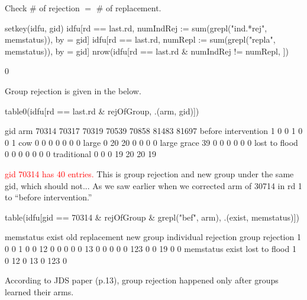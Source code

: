 Check \# of rejection $=$ \# of replacement.
\begin{Schunk}
\begin{Sinput}
setkey(idfu, gid)
idfu[rd == last.rd, numIndRej := sum(grepl("ind.*rej", memstatus)), by = gid]
idfu[rd == last.rd, numRepl := sum(grepl("repla", memstatus)), by = gid]
nrow(idfu[rd == last.rd & numIndRej != numRepl, ])
\end{Sinput}
\begin{Soutput}
[1] 0
\end{Soutput}
\end{Schunk}
Group rejection is given in the below.
\begin{Schunk}
\begin{Sinput}
table0(idfu[rd == last.rd & rejOfGroup, .(arm, gid)])
\end{Sinput}
\begin{Soutput}
                     gid
arm                   70314 70317 70319 70539 70858 81483 81697
  before intervention     1     0     0     1     0     0     1
  cow                     0     0     0     0     0     0     0
  large                   0    20    20     0     0     0     0
  large grace            39     0     0     0     0     0     0
  lost to flood           0     0     0     0     0     0     0
  traditional             0     0     0    19    20    20    19
\end{Soutput}
\end{Schunk}
\textcolor{red}{\textsf{gid} 70314 has 40 entries.} This is group rejection and new group under the same gid, which should not... As we saw earlier when we corrected arm of 30714 in rd 1 to ``before intervention.'' 
\begin{Schunk}
\begin{Sinput}
table(idfu[gid == 70314 & rejOfGroup & grepl("bef", arm), .(exist, memstatus)])
\end{Sinput}
\begin{Soutput}
     memstatus
exist old replacement new group individual rejection group rejection
  1     0           0         1                    0               0
  12    0           0         0                    0               0
  13    0           0         0                    0               0
  123   0           0        19                    0               0
     memstatus
exist lost to flood
  1               0
  12              0
  13              0
  123             0
\end{Soutput}
\end{Schunk}
According to JDS paper (p.13), group rejection happened only after groups learned their arms. 

